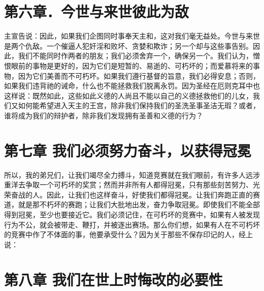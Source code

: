 
\section{第六章．今世与来世彼此为敌}

主宣告说：因此，如果我们企图同时事奉天主和，这对我们毫无益处。今世与来世是两个仇敌。一个催逼人犯奸淫和败坏、贪婪和欺诈；另一个却与这些事告别。因此，我们不能同时作两者的朋友；我们必须舍弃一个，确保另一个。我们认为，憎恨眼前的事物是更好的，因为它们是短暂的、易逝的、可朽坏的；而爱慕将来的事物，因为它们美善而不可朽坏。如果我们遵行基督的旨意，我们必得安息；否则，如果我们违背祂的诫命，什么也不能拯救我们脱离永罚。因为圣经在厄则克耳中也这样说：既然如此，这些如此义德的人尚且不能以自己的义德拯救他们的儿女，我们又如何能希望进入天主的王宫，除非我们保持我们的圣洗圣事圣洁无瑕？或者，谁将成为我们的辩护者，除非我们发现拥有圣善和义德的行为？\par


\section{第七章 我们必须努力奋斗，以获得冠冕}

所以，我的弟兄们，让我们竭尽全力搏斗，知道竞赛就在我们眼前，有许多人远涉重洋去争取一个可朽坏的奖赏；然而并非所有人都得冠冕，只有那些刻苦努力、光荣奋战的人。因此，让我们也这样奋斗，好使我们都得冠冕。让我们奔跑正直的赛道，就是那不朽坏的赛跑；让我们大批地出发，奋力争取冠冕。即使我们不能全部得到冠冕，至少也要接近它。我们必须记住，在可朽坏的竞赛中，如果有人被发现行为不公，就会被带走、鞭打，并被逐出赛场。那么你们想，如果有人在不可朽坏的竞赛中作了不体面的事，他要承受什么？因为关于那些不保存印记的人，经上说：\par


\section{第八章 我们在世上时悔改的必要性}

